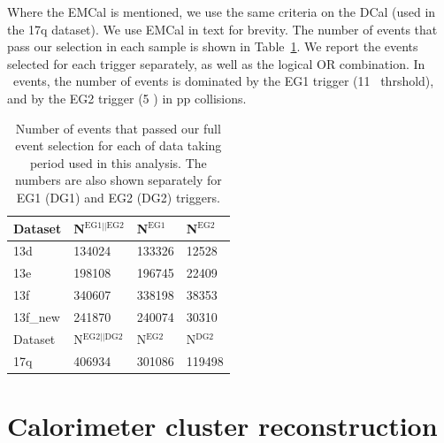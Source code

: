 Where the EMCal is mentioned, we use the same criteria on the DCal (used in the 17q dataset). We use EMCal in text for brevity.
The number of events that pass our selection in each sample is shown in Table~\ref{tab:eventsselected}. We report the events selected for each trigger separately, as well as the logical OR combination. In \pPb~events, the number of events is dominated by the EG1 trigger (11 \GeVc~thrshold), and by the EG2 trigger (5 \GeVc) in pp collisions. 

\begin{table}[h]
   \centering
   \caption{Number of events that passed our full event selection for each of data taking period used in this analysis. The numbers are also shown separately for EG1 (DG1) and EG2 (DG2) triggers.}
   \label{tab:eventsselected}
   \begin{tabular*}{1.0\columnwidth}{@{\extracolsep{\fill}}llll@{}}
    \hline
    Dataset &  	N$^{\mathrm{EG1||EG2}}$ &	N$^{\mathrm{EG1}}$ & N$^{\mathrm{EG2}}$\\
    \hline
    13d &	134024 & 133326 & 12528\\
    13e &	198108 & 196745 & 22409\\
    13f &   340607 & 338198 & 38353\\
    13f\_new & 241870 & 240074 & 30310\\
    \hline
    Dataset &	N$^{\mathrm{EG2 || DG2}}$ &		N$^{\mathrm{EG2}}$ & N$^{\mathrm{DG2}}$\\
    \hline

    17q & 406934 & 301086 & 119498 \\
 
    \hline
   \end{tabular*}
\end{table}

\section{Calorimeter cluster reconstruction}
\label{sec:clusterselection}
